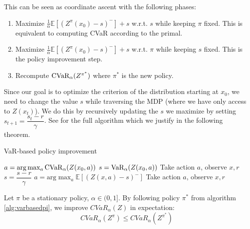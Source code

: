 This can be seen as coordinate ascent with the following phases:
\begin{enumerate}
\item Maximize $\frac{1}{\alpha}\mathbb{E}\left[ (Z^\pi(x_0)-s)^-\right] + s$ w.r.t. $s$ while keeping $\pi$ fixed. This is equivalent to computing CVaR according to the primal.
\item Maximize $\frac{1}{\alpha}\mathbb{E}\left[ (Z^\pi(x_0)-s)^-\right] + s$ w.r.t. $\pi$ while keeping $s$ fixed. This is the policy improvement step.
\item Recompute $\text{CVaR}_\alpha (Z^{\pi^*})$ where $\pi^*$ is the new policy.
\end{enumerate}
Since our goal is to optimize the criterion of the distribution starting at $x_0$, we need to change the value $s$ while traversing the MDP (where we have only access to $Z(x_t)$). We do this by recursively updating the $s$ we maximize by setting $s_{t+1} = \dfrac{s_t - r}{\gamma}$. See  for the full algorithm which we justify in the following theorem.

\begin{algorithm}
\caption{VaR-based policy improvement}
\label{alg:varbasedpi}
\begin{algorithmic}
    \STATE $a = \text{arg}\max_a \text{CVaR}_\alpha(Z(x_0, a))$
    \STATE $s = \text{VaR}_\alpha(Z(x_0, a))$
    \STATE Take action $a$, observe $x, r$
    	\STATE $s = \dfrac{s-r}{\gamma}$
    	\STATE $a = \text{arg}\max_a \mathbb{E}\left[(Z(x, a)-s)^- \right]$
    	\STATE Take action $a$, observe $x, r$
   	\ENDWHILE
\end{algorithmic}
\end{algorithm}

\begin{theorem}
Let $\pi$ be a stationary policy, $\alpha \in (0, 1]$. 
By following policy $\pi^*$ from algorithm \ref{alg:varbasedpi}, we improve $CVaR_\alpha(Z)$ in expectation:
$$CVaR_\alpha(Z^\pi) \le CVaR_\alpha(Z^{\pi^*})$$
%
%

\end{theorem}


